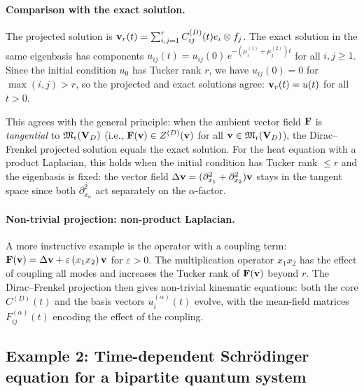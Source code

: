 \begin{example}
\paragraph{Comparison with the exact solution.}
The projected solution is $\mathbf{v}_r(t) = \sum_{i,j=1}^r C^{(D)}_{ij}(t)
e_i \otimes f_j$. The exact solution in the same eigenbasis has
components $u_{ij}(t) = u_{ij}(0)\, e^{-(\mu_i^{(1)}+\mu_j^{(2)})t}$
for all $i,j \geq 1$. Since the initial condition $u_0$ has Tucker
rank $r$, we have $u_{ij}(0) = 0$ for $\max(i,j) > r$, so the
projected and exact solutions agree: $\mathbf{v}_r(t) = u(t)$ for all $t > 0$.

\begin{remark}
This agrees with the general principle: when the ambient vector field
$\mathbf{F}$ is \emph{tangential} to $\mathfrak{M}_{\mathfrak{r}}(\mathbf{V}_D)$ (i.e., $\mathbf{F}(\mathbf{v})
\in Z^{(D)}(\mathbf{v})$ for all $\mathbf{v} \in \mathfrak{M}_{\mathfrak{r}}(\mathbf{V}_D)$), the Dirac--Frenkel
projected solution equals the exact solution. For the heat equation
with a product Laplacian, this holds when the initial condition has
Tucker rank $\leq r$ and the eigenbasis is fixed: the vector field
$\Delta\mathbf{v} = (\partial_{x_1}^2 + \partial_{x_2}^2)\mathbf{v}$ stays in the
tangent space since both $\partial_{x_\alpha}^2$ act separately on the
$\alpha$-factor.
\end{remark}

\paragraph{Non-trivial projection: non-product Laplacian.}
A more instructive example is the operator with a coupling term:
$\mathbf{F}(\mathbf{v}) = \Delta \mathbf{v} + \varepsilon\, (x_1 x_2)\, \mathbf{v}$ for
$\varepsilon > 0$. The multiplication operator $x_1 x_2$ has the effect
of coupling all modes and increases the Tucker rank of $\mathbf{F}(\mathbf{v})$
beyond $r$. The Dirac--Frenkel projection then gives non-trivial
kinematic equations: both the core $C^{(D)}(t)$ and the basis vectors
$u^{(\alpha)}_i(t)$ evolve, with the mean-field matrices
$F^{(\alpha)}_{ij}(t)$ encoding the effect of the coupling.
\end{example}

\subsection*{Example 2: Time-dependent Schrödinger equation for a
bipartite quantum system}

